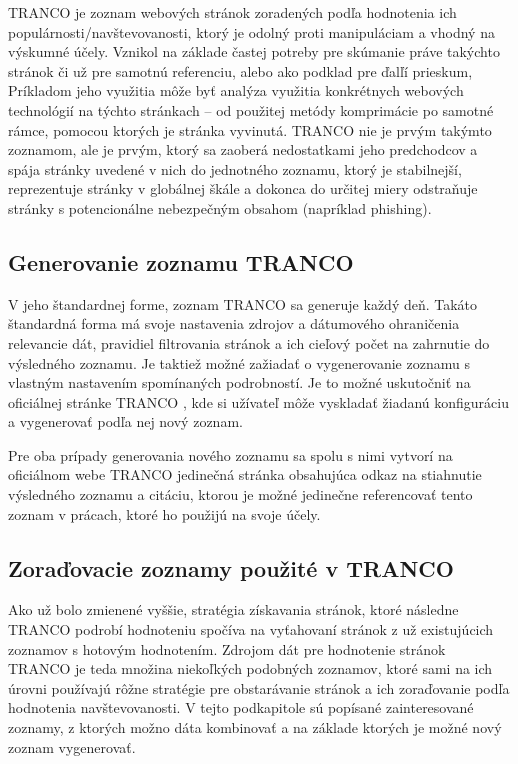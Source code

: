 TRANCO je zoznam webových stránok zoradených podľa hodnotenia ich populárnosti/navštevovanosti, ktorý je odolný proti manipuláciam a vhodný na výskumné účely. \cite{tranco-homepage} 
Vznikol na základe častej potreby pre skúmanie práve takýchto stránok či už pre samotnú referenciu, alebo ako podklad pre ďalľí prieskum,
Príkladom jeho využitia môže byť analýza využitia konkrétnych webových technológií na týchto stránkach -- od použitej metódy komprimácie po samotné rámce, pomocou ktorých je 
stránka vyvinutá. TRANCO nie je prvým takýmto zoznamom, ale je prvým, ktorý sa zaoberá nedostatkami jeho predchodcov a spája stránky uvedené v nich do jednotného zoznamu, 
ktorý je stabilnejší, reprezentuje stránky v globálnej škále a dokonca do určitej miery odstraňuje stránky s potencionálne nebezpečným obsahom (napríklad phishing). \cite{tranco} 

\subsection{Generovanie zoznamu TRANCO}

V jeho štandardnej forme, zoznam TRANCO sa generuje každý deň. Takáto štandardná forma má svoje nastavenia zdrojov a dátumového ohraničenia relevancie dát, 
pravidiel filtrovania stránok a ich cieľový počet na zahrnutie do výsledného zoznamu. \cite{tranco-config}
Je taktiež možné zažiadať o vygenerovanie zoznamu s vlastným nastavením spomínaných podrobností. Je to možné uskutočniť na oficiálnej stránke TRANCO ,
kde si užívateľ môže vyskladať žiadanú konfiguráciu a vygenerovať podľa nej nový zoznam. 

Pre oba prípady generovania nového zoznamu sa spolu s nimi vytvorí na oficiálnom webe TRANCO jedinečná stránka obsahujúca odkaz na stiahnutie výsledného zoznamu a citáciu, 
ktorou je možné jedinečne referencovať tento zoznam v prácach, ktoré ho použijú na svoje účely. 

\subsection{Zoraďovacie zoznamy použité v TRANCO}

Ako už bolo zmienené vyššie, stratégia získavania stránok, ktoré následne TRANCO podrobí hodnoteniu spočíva na vyťahovaní stránok z už existujúcich zoznamov s hotovým hodnotením. 
Zdrojom dát pre hodnotenie stránok TRANCO je teda množina niekoľkých podobných zoznamov, ktoré sami na ich úrovni používajú rôžne stratégie pre obstarávanie stránok a ich zoraďovanie 
podľa hodnotenia navštevovanosti. \cite{tranco-methodology} V tejto podkapitole sú popísané zainteresované zoznamy, z ktorých možno dáta kombinovať 
a na základe ktorých je možné nový zoznam vygenerovať.

